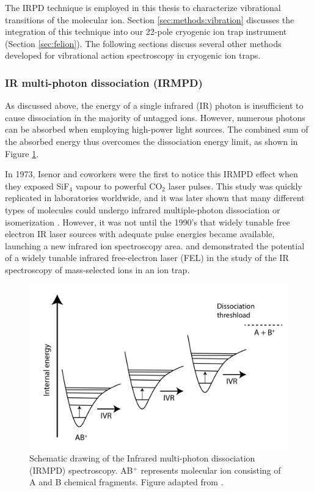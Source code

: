 The IRPD technique is employed in this thesis to characterize vibrational transitions of the molecular ion. Section \ref{sec:methods:vibration} discusses the integration of this technique into our 22-pole cryogenic ion trap instrument (Section \ref{sec:felion}). The following sections discuss several other methods developed for vibrational action spectroscopy in cryogenic ion traps.

\subsubsection{IR multi-photon dissociation (IRMPD)}
\label{subsec:action:methods:vibrational:IRMPD}

As discussed above, the energy of a single infrared (IR) photon is insufficient to cause dissociation in the majority of untagged ions. However, numerous photons can be absorbed when employing high-power light sources. The combined sum of the absorbed energy thus overcomes the dissociation energy limit, as shown in Figure \ref{fig:IRMPD}.

In 1973, Isenor and coworkers \cite{isenor_co2_1973} were the first to notice this IRMPD effect when they exposed SiF$_4$ vapour to powerful CO$_2$ laser pulses. This study was quickly replicated in laboratories worldwide, and it was later shown that many different types of molecules could undergo infrared multiple-photon dissociation or isomerization \cite{wight_infrared_1981, gaumann_infrared_1990, peiris_infrared_1993}. However, it was not until the 1990's that widely tunable free electron IR laser sources with adequate pulse energies became available, launching a new infrared ion spectroscopy area. \citet{oomens_gas-phase_2000} and \citet{lemaire_gas_2002} demonstrated the potential of a widely tunable infrared free-electron laser (FEL) in the study of the IR spectroscopy of mass-selected ions in an ion trap. 

\begin{figure}[!htb]
    \centering
    \includegraphics[scale=0.5]{figures/intro/IRMPD_IVR.png}
    \caption{Schematic drawing of the Infrared multi-photon dissociation (IRMPD) spectroscopy. AB$^+$ represents molecular ion consisting of A and B chemical fragments. Figure adapted from \cite{cpolfer_infrared_2011}.}
    \label{fig:IRMPD}
\end{figure}

